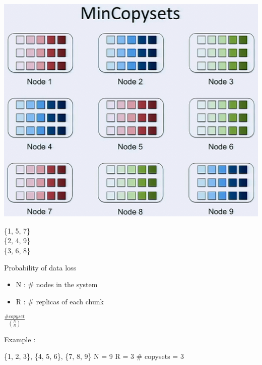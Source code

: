 \documentclass[xcolor=table]{beamer}
\begin{document}
	\begin{frame}
		\begin{minipage}[b]{0.69\linewidth}
			\centering
			
			\includegraphics[width=1\textwidth]{4.png}
		\end{minipage}
		\begin{minipage}[b]{0.29\linewidth}
			\begin{center}
				\alert{	\{1, 5, 7\}\\
						\{2, 4, 9\}\\
						\{3, 6, 8\} }
			\end{center}
		\end{minipage}
	\end{frame}

	\begin{frame}{Probability of data loss}
		\begin{minipage}[h]{0.49\linewidth}
			\centering
			\small
			\begin{itemize}
				\item N : \# nodes in the system
				\item R : \# replicas of each chunk
			\end{itemize}
		\end{minipage}
		\begin{minipage}[h]{0.49\linewidth}
			\centering
			\Huge
			$\frac{\# copyset}{\binom{N}{R}}$
		\end{minipage}
		\newline
		\newline
		Example :
		\begin{center}
			\alert{\{1, 2, 3\}, \{4, 5, 6\}, \{7, 8, 9\}}
			\newline
			\newline
			N = 9\newline
			R = 3
			\newline
			\newline
			\# copysets = 3
			\newline
		\end{center}
	\end{frame}
\end{document}
